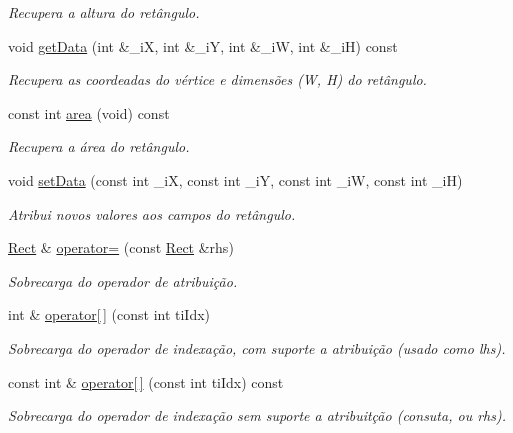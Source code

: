 \begin{DoxyCompactItemize}
\begin{DoxyCompactList}\small\item\em Recupera a altura do ret\^{a}ngulo. \end{DoxyCompactList}\item 
void \hyperlink{classrectangle_1_1Rect_a8e876f3cf8c84f666a27e4ac53002b3e}{get\-Data} (int \&\-\_\-i\-X, int \&\-\_\-i\-Y, int \&\-\_\-i\-W, int \&\-\_\-i\-H) const 
\begin{DoxyCompactList}\small\item\em Recupera as coordeadas do v\'{e}rtice e dimens\~{o}es (W, H) do ret\^{a}ngulo. \end{DoxyCompactList}\item 
const int \hyperlink{classrectangle_1_1Rect_ad5766881744587377fe0e9964d928e1d}{area} (void) const 
\begin{DoxyCompactList}\small\item\em Recupera a \'{a}rea do ret\^{a}ngulo. \end{DoxyCompactList}\item 
void \hyperlink{classrectangle_1_1Rect_af388209e7f7a5329eb7b906f254a8a9a}{set\-Data} (const int \-\_\-i\-X, const int \-\_\-i\-Y, const int \-\_\-i\-W, const int \-\_\-i\-H)
\begin{DoxyCompactList}\small\item\em Atribui novos valores aos campos do ret\^{a}ngulo. \end{DoxyCompactList}\item 
\hyperlink{classrectangle_1_1Rect}{Rect} \& \hyperlink{classrectangle_1_1Rect_a65edca18dfba7e1693568d5f3e819d26}{operator=} (const \hyperlink{classrectangle_1_1Rect}{Rect} \&rhs)
\begin{DoxyCompactList}\small\item\em Sobrecarga do operador de atribui\c{c}\~{a}o. \end{DoxyCompactList}\item 
int \& \hyperlink{classrectangle_1_1Rect_ab85de12f892ba96201f4174315b42732}{operator\mbox{[}$\,$\mbox{]}} (const int ti\-Idx)
\begin{DoxyCompactList}\small\item\em Sobrecarga do operador de indexa\c{c}\~{a}o, com suporte a atribui\c{c}\~{a}o (usado como lhs). \end{DoxyCompactList}\item 
const int \& \hyperlink{classrectangle_1_1Rect_ae0afe2cc84876c7feea7af546b8ce758}{operator\mbox{[}$\,$\mbox{]}} (const int ti\-Idx) const 
\begin{DoxyCompactList}\small\item\em Sobrecarga do operador de indexa\c{c}\~{a}o sem suporte a atribuit\c{c}\~{a}o (consuta, ou rhs). \end{DoxyCompactList}\end{DoxyCompactItemize}
